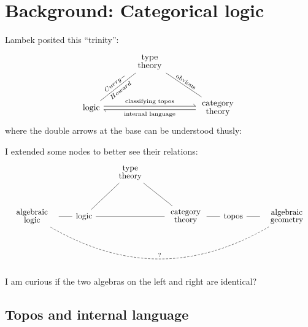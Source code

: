 \chapter{Background: Categorical logic}\label{chap:background2}

Lambek posited this ``trinity'':
\begin{equation}
\begin{tikzcd}[row sep=1cm, column sep=1cm]
& \parbox{1.5cm}{\linespread{-0.5}\selectfont\centering type theory} \arrow[dl,dash,"Curry-","Howard"',sloped] \arrow[dr,dash,"\text{obvious}",sloped] & \\
\mbox{logic} \arrow[rr,shift left=2pt,harpoon,"\text{classifying topos}"]  & {} & \parbox{1.5cm}{\linespread{-0.5}\selectfont\centering category theory}
\arrow[ll, shift left=2pt, harpoon, "\text{internal language}"]
\end{tikzcd}
\end{equation}
where the double arrows at the base can be understood thusly:


I extended some nodes to better see their relations:
\begin{equation}
\begin{tikzcd}[row sep=1cm, column sep=0.6cm]
& & \parbox{1.5cm}{\linespread{-0.5}\selectfont\centering type theory} \arrow[dl,dash] \arrow[dr,dash] & & & \\
\parbox{2cm}{\linespread{-0.5}\selectfont\centering algebraic logic} \arrow[rrrrr, dashed, dash, bend right,"?"] \arrow[r,dash] & \mbox{logic} \arrow[rr,dash] & {} & \parbox{1.5cm}{\linespread{-0.5}\selectfont\centering category theory} \arrow[r,dash] & \mbox{topos} \arrow[r,dash] & \parbox{2cm}{\linespread{-0.5}\selectfont\centering algebraic geometry}
\end{tikzcd}
\end{equation}
I am curious if the two algebras on the left and right are identical?

\section{Topos and internal language}


